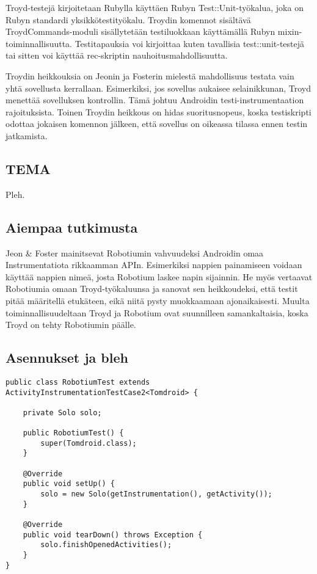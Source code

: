 Troyd-testejä kirjoitetaan Rubylla käyttäen Rubyn Test::Unit-työkalua, joka on Rubyn standardi yksikkötestityökalu. \cite{testunit} Troydin komennot sisältävä TroydCommands-moduli sisällytetään testiluokkaan käyttämällä Rubyn mixin-toiminnallisuutta. Testitapauksia voi kirjoittaa kuten tavallisia test::unit-testejä tai sitten voi käyttää rec-skriptin nauhoitusmahdollisuutta.

Troydin heikkouksia on Jeonin ja Fosterin mielestä mahdollisuus testata vain yhtä sovellusta kerrallaan. Esimerkiksi, jos sovellus aukaisee selainikkunan, Troyd menettää sovelluksen kontrollin. Tämä johtuu Androidin testi-instrumentaation rajoituksista. Toinen Troydin heikkous on hidas suoritusnopeus, koska testiskripti odottaa jokaisen komennon jälkeen, että sovellus on oikeassa tilassa ennen testin jatkamista. \cite{troyd}

\subsection{TEMA}

Pleh.

\subsection{Aiempaa tutkimusta}

Jeon \& Foster mainitsevat Robotiumin vahvuudeksi Androidin omaa Instrumentatiota rikkaamman APIn. Esimerkiksi nappien painamiseen voidaan käyttää nappien nimeä, josta Robotium laskee napin sijainnin. He myös vertaavat Robotiumia omaan Troyd-työkaluunsa ja sanovat sen heikkoudeksi, että testit pitää määritellä etukäteen, eikä niitä pysty muokkaamaan ajonaikaisesti. Muulta toiminnallisuudeltaan Troyd ja Robotium ovat suunnilleen samankaltaisia, koska Troyd on tehty Robotiumin päälle. \cite{troyd}

\subsection{Asennukset ja bleh}

\begin{lstlisting}[float,label=robotium_setup,caption=Robotium testirunko]
public class RobotiumTest extends ActivityInstrumentationTestCase2<Tomdroid> {

	private Solo solo;
	
	public RobotiumTest() {
		super(Tomdroid.class);
	}
	
	@Override
	public void setUp() {
		solo = new Solo(getInstrumentation(), getActivity());
	}
	
	@Override
	public void tearDown() throws Exception {
		solo.finishOpenedActivities();
	}
}
\end{lstlisting}

